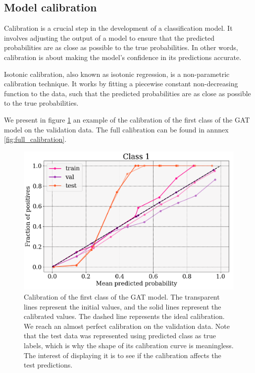 \documentclass[switch, 11pt]{article}
\begin{document}
\begin{multicols}{2}
    \subsection{Model calibration}

    Calibration is a crucial step in the development of a classification model. It involves adjusting the output of a model to ensure that the predicted probabilities are as close as possible to the true probabilities. In other words, calibration is about making the model's confidence in its predictions accurate.

    Isotonic calibration, also known as isotonic regression, is a non-parametric calibration technique. It works by fitting a piecewise constant non-decreasing function to the data, such that the predicted probabilities are as close as possible to the true probabilities.

    We present in figure \ref{fig:calibration} an example of the calibration of the first class of the GAT model on the validation data. The full calibration can be found in annnex \ref{fig:full_calibration}.

    \begin{figure}[H]
        \centering
        \includegraphics[width=\columnwidth]{figures/small_calibration.png}
        \caption{Calibration of the first class of the GAT model. The transparent lines represent the initial values, and the solid lines represent the calibrated values. The dashed line represents the ideal calibration. We reach an almost perfect calibration on the validation data. Note that the test data was represented using predicted class as true labels, which is why the shape of its calibration curve is meaningless. The interest of displaying it is to see if the calibration affects the test predictions.}
        \label{fig:calibration}
    \end{figure}


\end{multicols}
\end{document}
